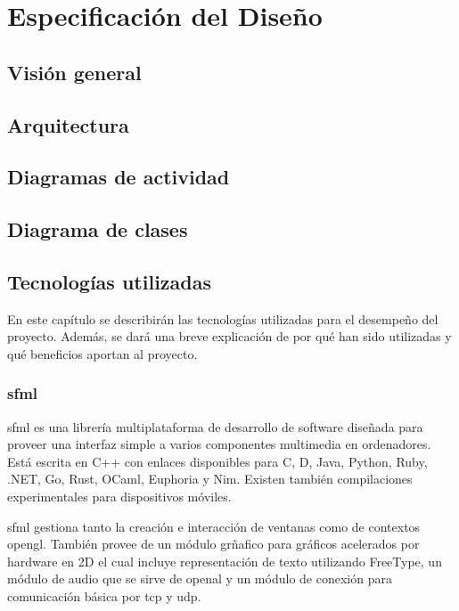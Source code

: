 \chapter{Especificación del Diseño}

\section{Visión general}

\section{Arquitectura}

\section{Diagramas de actividad}

\section{Diagrama de clases}

\section{Tecnologías utilizadas}

	En este capítulo se describirán las tecnologías utilizadas para el desempeño del proyecto. Además, se dará una breve explicación de por qué han sido utilizadas y qué beneficios aportan al proyecto.

	\subsection{\acrshort{sfml}}

		\acrfull{sfml} es una librería multiplataforma de desarrollo de software diseñada para proveer una interfaz simple a varios componentes multimedia en ordenadores. Está escrita en C++ con enlaces disponibles para C, D, Java, Python, Ruby, .NET, Go, Rust, OCaml, Euphoria y Nim. Existen también compilaciones experimentales para dispositivos móviles.

		\acrshort{sfml} gestiona tanto la creación e interacción de ventanas como de contextos \acrshort{opengl}. También provee de un módulo grñafico para gráficos acelerados por hardware en 2D el cual incluye representación de texto utilizando FreeType, un módulo de audio que se sirve de \acrshort{openal} y un módulo de conexión para comunicación básica por \acrshort{tcp} y \acrshort{udp}.

